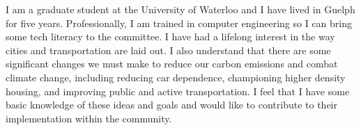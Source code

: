 
\begin{cvparagraph}

I am a graduate student at the University of Waterloo and I have lived in Guelph for five years.
Professionally, I am trained in computer engineering so I can bring some tech literacy to the committee.
I have had a lifelong interest in the way cities and transportation are laid out.
I also understand that there are some significant changes we must make to reduce our carbon emissions and combat climate change, including reducing car dependence, championing higher density housing, and improving public and active transportation.
I feel that I have some basic knowledge of these ideas and goals and would like to contribute to their implementation within the community.
    
\end{cvparagraph}
